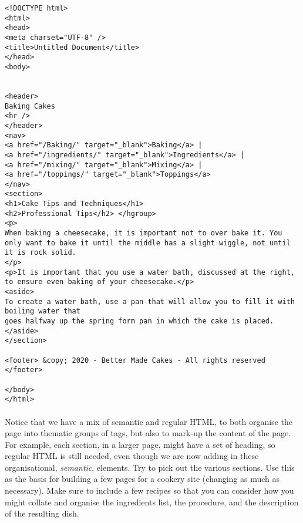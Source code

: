 \documentclass[10pt, a4paper, twosize]{article}
\begin{document}
\begin{lstlisting}
<!DOCTYPE html>
<html> 
<head>
<meta charset="UTF-8" />
<title>Untitled Document</title> 
</head>
<body>


<header>
Baking Cakes
<hr />
</header>
<nav>
<a href="/Baking/" target="_blank">Baking</a> |
<a href="/ingredients/" target="_blank">Ingredients</a> | 
<a href="/mixing/" target="_blank">Mixing</a> |
<a href="/toppings/" target="_blank">Toppings</a>
</nav>
<section>
<h1>Cake Tips and Techniques</h1>
<h2>Professional Tips</h2> </hgroup>
<p>
When baking a cheesecake, it is important not to over bake it. You only want to bake it until the middle has a slight wiggle, not until it is rock solid.
</p>
<p>It is important that you use a water bath, discussed at the right, to ensure even baking of your cheesecake.</p>
<aside>
To create a water bath, use a pan that will allow you to fill it with boiling water that
goes halfway up the spring form pan in which the cake is placed.
</aside>
</section>

<footer> &copy; 2020 - Better Made Cakes - All rights reserved </footer>

</body>
</html>
\end{lstlisting}

\paragraph{} Notice that we have a mix of semantic and regular HTML, to both organise the page into thematic groups of tags, but also to mark-up the content of the page. For example, each section, in a larger page, might have a set of heading, so regular HTML is still needed, even though we are now adding in these organisational, \emph{semantic}, elements. Try to pick out the various sections. Use this as the basis for building a few pages for a cookery site (changing as much as necessary). Make sure to include a few recipes so that you can consider how you might collate and organise the ingredients list, the procedure, and the description of the resulting dish.
\end{document}
